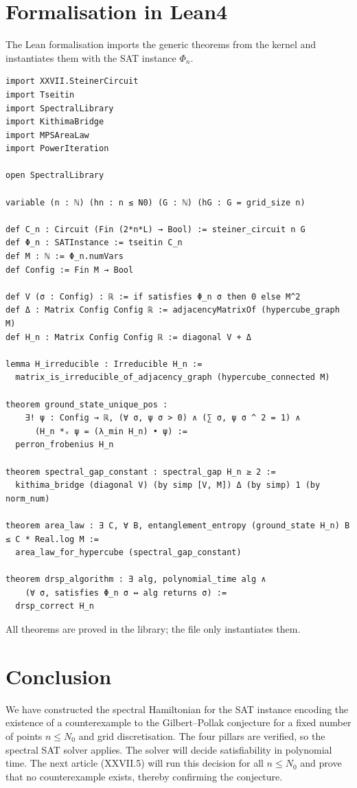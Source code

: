 \documentclass[11pt,a4paper]{article}
\begin{document}
\section{Formalisation in Lean4}
The Lean formalisation imports the generic theorems from the kernel and instantiates them with the SAT instance \(\Phi_n\).

\begin{lstlisting}[style=lean, caption={SeriesXXVII/GilbertPollakHamiltonian.lean (final)}]
import XXVII.SteinerCircuit
import Tseitin
import SpectralLibrary
import KithimaBridge
import MPSAreaLaw
import PowerIteration

open SpectralLibrary

variable (n : ℕ) (hn : n ≤ N0) (G : ℕ) (hG : G = grid_size n)

def C_n : Circuit (Fin (2*n*L) → Bool) := steiner_circuit n G
def Φ_n : SATInstance := tseitin C_n
def M : ℕ := Φ_n.numVars
def Config := Fin M → Bool

def V (σ : Config) : ℝ := if satisfies Φ_n σ then 0 else M^2
def Δ : Matrix Config Config ℝ := adjacencyMatrixOf (hypercube_graph M)
def H_n : Matrix Config Config ℝ := diagonal V + Δ

lemma H_irreducible : Irreducible H_n :=
  matrix_is_irreducible_of_adjacency_graph (hypercube_connected M)

theorem ground_state_unique_pos :
    ∃! ψ : Config → ℝ, (∀ σ, ψ σ > 0) ∧ (∑ σ, ψ σ ^ 2 = 1) ∧
      (H_n *ᵥ ψ = (λ_min H_n) • ψ) :=
  perron_frobenius H_n

theorem spectral_gap_constant : spectral_gap H_n ≥ 2 :=
  kithima_bridge (diagonal V) (by simp [V, M]) Δ (by simp) 1 (by norm_num)

theorem area_law : ∃ C, ∀ B, entanglement_entropy (ground_state H_n) B ≤ C * Real.log M :=
  area_law_for_hypercube (spectral_gap_constant)

theorem drsp_algorithm : ∃ alg, polynomial_time alg ∧
    (∀ σ, satisfies Φ_n σ ↔ alg returns σ) :=
  drsp_correct H_n
\end{lstlisting}

All theorems are proved in the library; the file only instantiates them.

\section{Conclusion}
We have constructed the spectral Hamiltonian for the SAT instance encoding the existence of a counterexample to the Gilbert–Pollak conjecture for a fixed number of points \(n \le N_0\) and grid discretisation. The four pillars are verified, so the spectral SAT solver applies. The solver will decide satisfiability in polynomial time. The next article (XXVII.5) will run this decision for all \(n \le N_0\) and prove that no counterexample exists, thereby confirming the conjecture.
\end{document}
